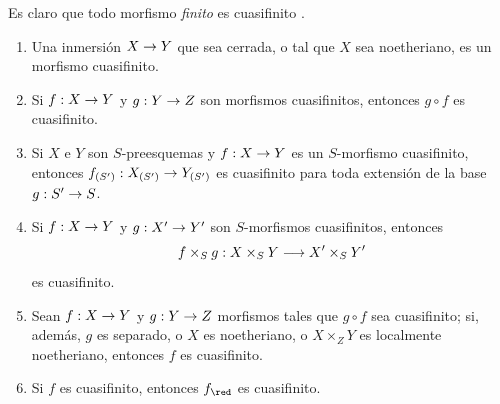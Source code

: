 \documentclass[oneside,10pt]{amsart}
\makeatletter
\newcommand{\ega@arrow}[2]{\mathchoice{#1}{#2}{#2}{#2}}
\renewcommand{\to}{\ega@arrow{\longrightarrow}{\rightarrow}}
\let\EGAOriginalLabel\label
\renewcommand{\label}[1]{\phantomsection\EGAOriginalLabel{#1}}
\makeatother
\begin{document}
Es claro que todo morfismo \emph{finito} es cuasifinito .

\begin{proposition}[6.2.4]
\label{II.6.2.4}
\medskip\noindent
\begin{enumerate}
  \item[{\rm(i)}] Una inmersión $X\to Y$ que sea cerrada, o tal que $X$ sea noetheriano, es un morfismo cuasifinito.
  \item[{\rm(ii)}] Si $f:X\to Y$ y $g:Y\to Z$ son morfismos cuasifinitos, entonces $g\circ f$ es cuasifinito.
  \item[{\rm(iii)}] Si $X$ e $Y$ son $S$-preesquemas y $f:X\to Y$ es un $S$-morfismo cuasifinito, entonces $f_{(S')}:X_{(S')}\to Y_{(S')}$ es cuasifinito para toda extensión de la base $g:S'\to S$.
  \item[{\rm(iv)}] Si $f:X\to Y$ y $g:X'\to Y'$ son $S$-morfismos cuasifinitos, entonces
    \[
      f\times_S g : X\times_S Y \to X'\times_S Y'
    \]
    es cuasifinito.
  \item[{\rm(v)}] Sean $f:X\to Y$ y $g:Y\to Z$ morfismos tales que $g\circ f$ sea cuasifinito; si, además, $g$ es separado, o $X$ es noetheriano, o $X\times_Z Y$ es localmente noetheriano, entonces $f$ es cuasifinito.
  \item[{\rm(vi)}] Si $f$ es cuasifinito, entonces $f_\red$ es cuasifinito.
\end{enumerate}
\end{proposition}
\end{document}
